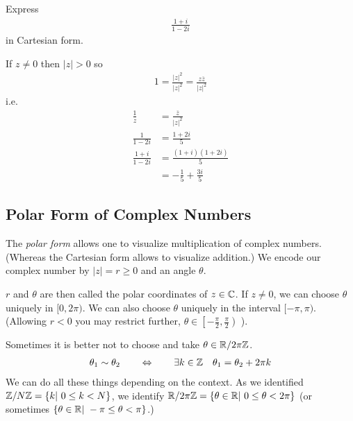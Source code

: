 
\begin{ex}
	\begin{qu}
		Express 
		\begin{align*}
		\frac{1+i}{1-2i}
		\end{align*}
		in Cartesian form.
	\end{qu}
	
	\begin{an}
	If $z \neq 0$ then $|z| >0$ so 
	\begin{align*}
	1 = \frac{|z|^2}{|z|^2} = \frac{z \overline z}{|z|^2}
	\end{align*}
	i.e.
	\begin{align*}
	\frac 1 z & = \frac{\overline z}{|z|^2} \\
	\frac 1 {1-2i} & = \frac{1+2i}{5} \\
	\frac{1+i}{1-2i} & = \frac{(1+i)(1+2i)} 5 \\
	& = -\frac 1 5 + \frac{3i} 5 
	\end{align*}
	\end{an}
\end{ex}


\subsection{Polar Form of Complex Numbers}
The \emph{polar form} allows one to visualize multiplication of complex numbers. (Whereas the Cartesian form allows to visualize addition.) We encode our complex number by $|z| = r\ge 0$ and an angle $\theta$.

$r$ and $\theta$ are then called the polar coordinates of $z \in \mathbb C$. 
If $z \neq 0$, we can choose $\theta$ uniquely in $[0,2\pi)$. We can also choose $\theta$ uniquely in the interval $[-\pi,\pi)$. (Allowing $r<0$ you may restrict further, $\theta \in \left[ -\frac \pi 2, \frac \pi 2 \right)$ ).

Sometimes it is better not to choose and take $\theta \in \mathbb R/2\pi\mathbb Z$.
\begin{align*}
\theta_1 \sim \theta_2 \qquad \Leftrightarrow \qquad \exists k\in \mathbb Z \quad \theta_1 = \theta_2 + 2\pi k
\end{align*}
We can do all these things depending on the context. As we identified $\mathbb Z/N\mathbb Z = \{k|~ 0\le k <N \}$, we identify $\mathbb R/2\pi \mathbb Z = \{\theta \in \mathbb R|~ 0\le \theta < 2\pi \}$ (or sometimes $\{\theta \in \mathbb R|~ -\pi\le \theta < \pi \}$.)

